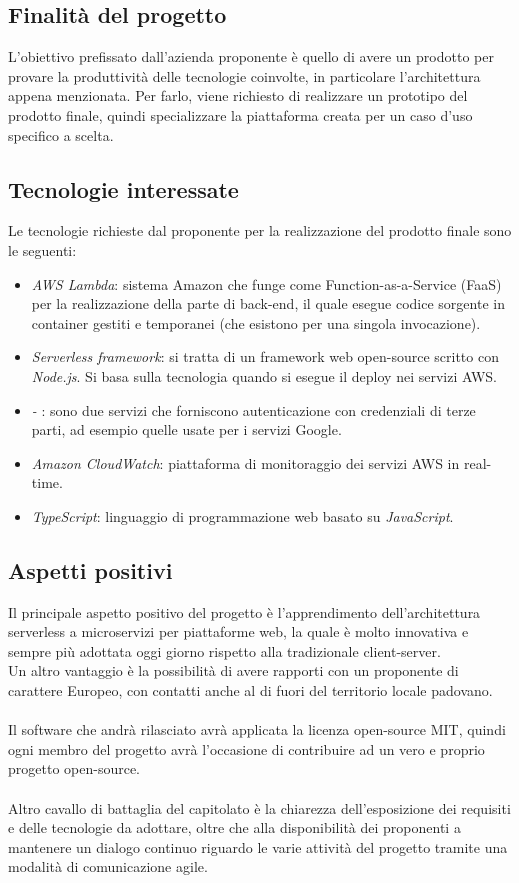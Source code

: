 \subsection{Finalità del progetto}
L'obiettivo prefissato dall'azienda proponente è quello di avere un prodotto per provare la produttività delle tecnologie coinvolte, in particolare l'architettura appena menzionata. Per farlo, viene richiesto di realizzare un prototipo del prodotto finale, quindi specializzare la piattaforma creata per un caso d'uso specifico a scelta.

\subsection{Tecnologie interessate}
Le tecnologie richieste dal proponente per la realizzazione del prodotto finale sono le seguenti:
\begin{itemize}
	\item \textit{AWS Lambda}: sistema Amazon che funge come Function-as-a-Service (FaaS) per la realizzazione della parte di back-end, il quale esegue codice sorgente in container gestiti e temporanei (che esistono per una singola invocazione).
	\item \textit{Serverless framework}: si tratta di un framework web open-source scritto con \textit{Node.js}. Si basa sulla tecnologia \textit{} quando si esegue il deploy nei servizi AWS.
	\item \textit{ - }: sono due servizi che forniscono autenticazione con credenziali di terze parti, ad esempio quelle usate per i servizi Google.
	\item \textit{Amazon CloudWatch}: piattaforma di monitoraggio dei servizi AWS in real-time.
	\item \textit{TypeScript}: linguaggio di programmazione web basato su \textit{JavaScript}.
\end{itemize}

\subsection{Aspetti positivi}
Il principale aspetto positivo del progetto è l'apprendimento dell'architettura serverless a microservizi per piattaforme web, la quale è molto innovativa e sempre più adottata oggi giorno rispetto alla tradizionale client-server.\\
Un altro vantaggio è la possibilità di avere rapporti con un proponente di carattere Europeo, con contatti anche al di fuori del territorio locale padovano.\\\\
Il software che andrà rilasciato avrà applicata la licenza open-source MIT, quindi ogni membro del progetto avrà l'occasione di contribuire ad un vero e proprio progetto open-source.\\\\
Altro cavallo di battaglia del capitolato è la chiarezza dell'esposizione dei requisiti e delle tecnologie da adottare, oltre che alla disponibilità dei proponenti a mantenere un dialogo continuo riguardo le varie attività del progetto tramite una modalità di comunicazione agile.

